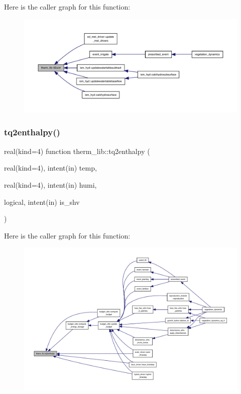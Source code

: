 Here is the caller graph for this function\+:
\nopagebreak
\begin{figure}[H]
\begin{center}
\leavevmode
\includegraphics[width=350pt]{namespacetherm__lib_a3ad59a4037ed8ed57532b8ea630a7df1_icgraph}
\end{center}
\end{figure}
\mbox{\label{namespacetherm__lib_addd05382298a8487d09d7f6e2664dd62}} 
\subsubsection{\texorpdfstring{tq2enthalpy()}{tq2enthalpy()}}
{\footnotesize\ttfamily real(kind=4) function therm\+\_\+lib\+::tq2enthalpy (\begin{DoxyParamCaption}\item[{real(kind=4), intent(in)}]{temp,  }\item[{real(kind=4), intent(in)}]{humi,  }\item[{logical, intent(in)}]{is\+\_\+shv }\end{DoxyParamCaption})}

Here is the caller graph for this function\+:
\nopagebreak
\begin{figure}[H]
\begin{center}
\leavevmode
\includegraphics[width=350pt]{namespacetherm__lib_addd05382298a8487d09d7f6e2664dd62_icgraph}
\end{center}
\end{figure}
\mbox{\label{namespacetherm__lib_a45fb7d736264472e118c794a243911fe}} 
